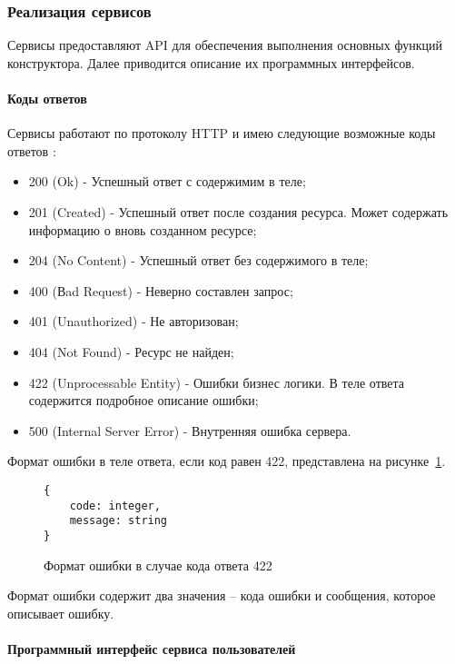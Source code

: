 \subsubsection{Реализация сервисов}

Сервисы предоставляют API для обеспечения выполнения основных функций конструктора.
Далее приводится описание их программных интерфейсов.

\paragraph{Коды ответов}

Сервисы работают по протоколу HTTP и имею следующие возможные
коды ответов :
\begin{itemize}
	\item 200 (Ok) - Успешный ответ с содержимим в теле;
	\item 201 (Created) - Успешный ответ после создания ресурса. Может
	      содержать информацию о вновь созданном ресурсе;
	\item 204 (No Content) - Успешный ответ без содержимого в теле;
	\item 400 (Вad Request) - Неверно составлен запрос;
	\item 401 (Unauthorized) - Не авторизован;
	\item 404 (Not Found) - Ресурс не найден;
	\item 422 (Unprocessable Entity) - Ошибки бизнес логики. В теле ответа
	      содержится подробное описание ошибки;
	\item 500 (Internal Server Error) - Внутренняя ошибка сервера.
\end{itemize}

Формат ошибки в теле ответа, если код равен 422, представлена на
рисунке~\ref{f:error-struct}.


\begin{figure}[!ht]
	\centering
	\vspace{\toppaddingoffigure}
	\begin{lstlisting}
{
    code: integer,
    message: string
}
    \end{lstlisting}
	\caption{Формат ошибки в случае кода ответа 422}
	\label{f:error-struct}
\end{figure}

Формат ошибки содержит два значения – кода ошибки и сообщения,
которое описывает ошибку.

\paragraph{Программный интерфейс сервиса пользователей}

